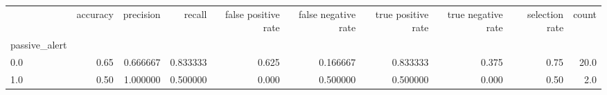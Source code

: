 \begin{tabular}{lrrrrrrrrr}
\toprule
{} &  accuracy &  precision &    recall &  false positive rate &  false negative rate &  true positive rate &  true negative rate &  selection rate &  count \\
passive\_alert &           &            &           &                      &                      &                     &                     &                 &        \\
\midrule
0.0           &      0.65 &   0.666667 &  0.833333 &                0.625 &             0.166667 &            0.833333 &               0.375 &            0.75 &   20.0 \\
1.0           &      0.50 &   1.000000 &  0.500000 &                0.000 &             0.500000 &            0.500000 &               0.000 &            0.50 &    2.0 \\
\bottomrule
\end{tabular}

